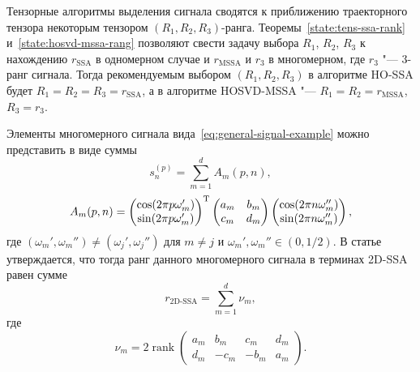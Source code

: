 \documentclass[specialist,
    substylefile=spbu.rtx,
    subf,href,colorlinks=true, 12pt]{disser}
\theoremstyle{plain}
\theoremstyle{definition}
\theoremstyle{remark}
\begin{document}
    Тензорные алгоритмы выделения сигнала сводятся к приближению траекторного тензора некоторым
    тензором $(R_1, R_2, R_3)$-ранга.
    Теоремы~\ref{state:tens-ssa-rank} и~\ref{state:hosvd-mssa-rang} позволяют свести задачу выбора $R_1$,
    $R_2$, $R_3$ к нахождению $r_{\text{SSA}}$ в одномерном случае и $r_\text{MSSA}$ и $r_3$ в многомерном,
    где $r_3$ "--- 3-ранг сигнала.
    Тогда рекомендуемым выбором $(R_1, R_2, R_3)$ в алгоритме HO-SSA будет $R_1=R_2=R_3=r_\text{SSA}$, а
    в алгоритме HOSVD-MSSA "--- $R_1=R_2=r_\text{MSSA}$, $R_3 = r_3$.

    Элементы многомерного сигнала вида~\eqref{eq:general-signal-example} можно
    представить в виде суммы
    \[
        s^{(p)}_n = \sum_{m=1}^{d} A_m(p, n),
    \]
    \[
        A_m(p, n) =
        \begin{pmatrix}
            \cos(2\pi p\omega_m') \\
            \sin(2\pi p\omega_m')
        \end{pmatrix}^{\mathrm{T}}
        \begin{pmatrix}
            a_m & b_m \\
            c_m & d_m
        \end{pmatrix}
        \begin{pmatrix}
            \cos(2\pi n\omega_m'') \\
            \sin(2\pi n\omega_m'')
        \end{pmatrix},
    \]
    где $(\omega_m', \omega_m'') \ne (\omega_j', \omega_j'')$ для $m\ne j$ и $\omega_m', \omega_m'' \in (0, 1/2)$.
    В статье~\cite{2d-ssa} утверждается, что тогда ранг данного многомерного сигнала в терминах
    2D-SSA равен сумме
    \[
        r_\text{2D-SSA} = \sum_{m=1}^{d} \nu_m,
    \]
    где
    \[
        \nu_m = 2\operatorname{rank}\begin{pmatrix}
            a_m & b_m  & c_m  & d_m \\
            d_m & -c_m & -b_m & a_m
        \end{pmatrix}.
    \]
\end{document}
